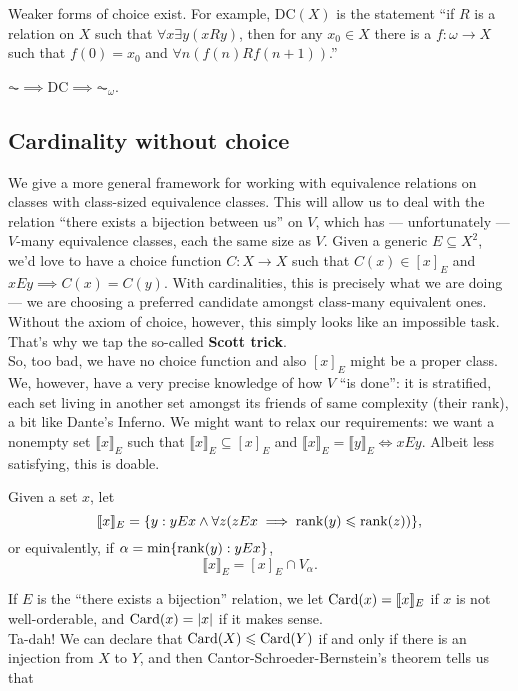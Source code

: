 \documentclass[twoside,openright,titlepage,numbers=noenddot,%
               headinclude,footinclude,cleardoublepage=empty,abstract=on,
               BCOR=23mm,paper=letter,fontsize=11pt
               ]{scrreprt}
\begin{document}
Weaker forms of choice exist. For example, $\mathrm{DC}(X)$ is the statement ``if $R$ is a relation on $X$ such that $\forall x \exists y(x R y)$, then for any $x_0 \in X$ there is a $f: \omega \to X$ such that $f(0) = x_0$ and $\forall n(f(n) R f(n+1))$.''
\begin{lemma}
    $\AC \implies \mathrm{DC} \implies \AC_\omega$.
\end{lemma}
\subsection{Cardinality without choice}
We give a more general framework for working with equivalence relations on classes with class-sized equivalence classes. This will allow us to deal with the relation ``there exists a bijection between us'' on $V$, which has --- unfortunately --- $V$-many equivalence classes, each the same size as $V$.
Given a generic $E \subseteq X^2$, we'd love to have a choice function $C: X \to X$ such that $C(x) \in [x]_E$ and $x E y \implies C(x) = C(y)$. With cardinalities, this is precisely what we are doing --- we are choosing a preferred candidate amongst class-many equivalent ones. Without the axiom of choice, however, this simply looks like an impossible task. That's why we tap the so-called \textbf{Scott trick}. \\
So, too bad, we have no choice function and also $[x]_E$ might be a proper class. We, however, have a very precise knowledge of how $V$ ``is done'': it is stratified, each set living in another set amongst its friends of same complexity (their rank), a bit like Dante's Inferno. We might want to relax our requirements: we want a nonempty set $\llbracket x \rrbracket_{E}$ such that $\llbracket x \rrbracket_E \subseteq [x]_E$ and $\llbracket x \rrbracket_E = \llbracket y \rrbracket_E \iff x E y$. Albeit less satisfying, this is doable.
\begin{definition}
    Given a set $x$, let
    \[ \llbracket x \rrbracket_E = \{ y: y E x \land \forall z (z E x \implies \mathrm{rank}(y) \leqslant \mathrm{rank}(z))\}, \]
    or equivalently, if $\alpha = \min\{\mathrm{rank}(y): y E x\}$,
    \[  \llbracket x \rrbracket_E = [x]_E \cap V_{\alpha}. \]
\end{definition}
If $E$ is the ``there exists a bijection'' relation, we let $\mathrm{Card}(x) = \llbracket x \rrbracket_E$ if $x$ is not well-orderable, and $\mathrm{Card}(x) = \vert x \vert$ if it makes sense. \\
Ta-dah! We can declare that $\mathrm{Card}(X) \leqslant \mathrm{Card}(Y)$ if and only if there is an injection from $X$ to $Y$, and then Cantor-Schroeder-Bernstein's theorem tells us that
\end{document}
